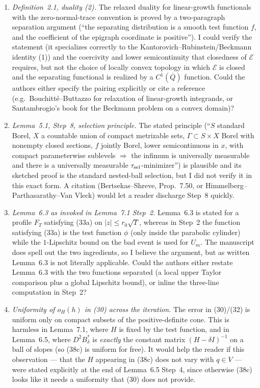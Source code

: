 \documentclass[11pt]{article}
\begin{document}
\begin{enumerate}[label=Q\arabic*., leftmargin=2.6em, itemsep=3pt]
  \item \emph{Definition~2.1, duality (2).} The relaxed duality for linear-growth functionals
  with the zero-normal-trace convention is proved by a two-paragraph separation argument
  (``the separating distribution is a smooth test function $f$, and the coefficient of the
  epigraph coordinate is positive''). I could verify the statement (it specializes correctly to
  the Kantorovich--Rubinstein/Beckmann identity (1)) and the coercivity and lower
  semicontinuity that closedness of $\mathcal E$ requires, but not the choice of locally convex
  topology in which $\mathcal E$ is closed and the separating functional is realized by a
  $C^1(\overline Q)$ function. Could the authors either specify the pairing explicitly or cite a
  reference (e.g.\ Bouchitt\'e--Buttazzo for relaxation of linear-growth integrands, or
  Santambrogio's book for the Beckmann problem on a convex domain)?
  \item \emph{Lemma~5.1, Step~8, selection principle.} The stated principle (``$S$ standard
  Borel, $X$ a countable union of compact metrizable sets, $\Gamma\subset S\times X$ Borel with
  nonempty closed sections, $f$ jointly Borel, lower semicontinuous in $x$, with compact
  parameterwise sublevels $\Rightarrow$ the infimum is universally measurable and there is a
  universally measurable $\tau_{\rm sel}$-minimizer'') is plausible and its sketched proof is the
  standard nested-ball selection, but I did not verify it in this exact form. A citation
  (Bertsekas--Shreve, Prop.\ 7.50, or Himmelberg--Parthasarathy--Van Vleck) would let a reader
  discharge Step~8 quickly.
  \item \emph{Lemma~6.3 as invoked in Lemma~7.1 Step~2.} Lemma~6.3 is stated for a profile $F_T$
  satisfying (33a) on $|z|\le r_0\sqrt T$, whereas in Step~2 the function satisfying (33a) is the
  test function $\phi$ (only inside the parabolic cylinder) while the $1$-Lipschitz bound on the
  bad event is used for $U_m$. The manuscript does spell out the two ingredients, so I believe
  the argument, but as written Lemma~6.3 is not literally applicable. Could the authors either
  restate Lemma~6.3 with the two functions separated (a local upper Taylor comparison plus a
  global Lipschitz bound), or inline the three-line computation in Step~2?
  \item \emph{Uniformity of $o_H(h)$ in (30) across the iteration.} The error in (30)/(32) is
  uniform only on compact subsets of the positive-definite cone. This is harmless in Lemma~7.1,
  where $H$ is fixed by the test function, and in Lemma~6.5, where $D^2B_\delta^*$ is
  \emph{exactly} the constant matrix $(H-\delta I)^{-1}$ on a ball of slopes (so (38c) is
  uniform for free). It would help the reader if this observation --- that the $H$ appearing in
  (38c) does not vary with $q\in V$ --- were stated explicitly at the end of Lemma~6.5 Step~4,
  since otherwise (38c) looks like it needs a uniformity that (30) does not provide.
\end{enumerate}
\end{document}
